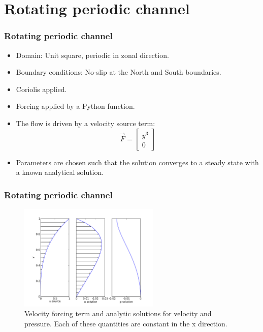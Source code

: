 \section{Rotating periodic channel}

\begin{frame}
    \frametitle{Rotating periodic channel}
\begin{itemize}
\item Domain: Unit square, periodic in zonal direction.
\item Boundary conditions: No-slip at the North and South boundaries.
\item Coriolis applied.
\item Forcing applied by a Python function.
\item The flow is driven by a velocity source term:
\begin{equation*}
  \vec{F}=
  \begin{bmatrix}
    y^3 \\
    0
  \end{bmatrix}
\end{equation*}
\item Parameters are chosen such that the solution converges to a steady state with a known analytical solution.
\end{itemize}
\end{frame}
%
\begin{frame}
    \frametitle{Rotating periodic channel}
\begin{figure}
\includegraphics[width=0.6\textwidth]{./rotating_channel/analytic_solution}
\caption{Velocity forcing term and analytic solutions for velocity and pressure.  Each of these quantities are constant in the x direction.}
\end{figure}
\end{frame}
%
